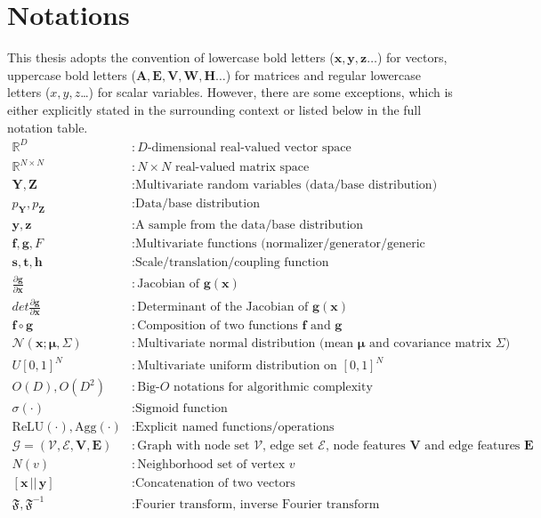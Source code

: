 \section{Notations}
This thesis adopts the convention of lowercase bold letters
($\mathbf{x,y,z}\ldots$) for vectors, uppercase bold letters
($\mathbf{A,E,V,W, H}\ldots$) for matrices and regular lowercase letters
($x,y,z$\ldots)
for scalar variables. However, there are some exceptions, which is either
explicitly stated in the surrounding context or listed below in the full notation table.
\begin{align*}
  \mathbb{R}^D &: \text{$D$-dimensional real-valued vector space} \\
  \mathbb{R}^{N \times N} &: \text{$N \times N$ real-valued matrix space} \\
  \mathbf{Y, Z} &: \text{Multivariate random variables (data/base
  distribution)} \\ p_{\mathbf{Y}}, p_{\mathbf{Z}} &: \text{Data/base
  distribution} \\ \mathbf{y, z} &: \text{A sample from the data/base
  distribution} \\ \mathbf{f, g}, F &: \text{Multivariate functions
  (normalizer/generator/generic function)} \\
  \mathbf{s}, \mathbf{t}, \mathbf{h} &: \text{Scale/translation/coupling function}\\
  \frac{\partial \mathbf{g}}{\partial \mathbf{x}} &:
  \text{Jacobian of $\mathbf{g}(\mathbf{x})$} \\ det \frac{\partial
  \mathbf{g}}{\partial \mathbf{x}} &: \text{Determinant of the Jacobian of
  $\mathbf{g}(\mathbf{x})$} \\ \mathbf{f} \circ \mathbf{g} &: \text{Composition
  of two functions $\mathbf{f}$ and $\mathbf{g}$} \\ \mathcal{N}(\mathbf{x};
  \mathbf{\mu}, \Sigma) &: \text{Multivariate normal distribution (mean
  $\mathbf{\mu}$ and covariance matrix $\Sigma$)} \\ U[0, 1]^{N} &:
  \text{Multivariate uniform distribution on $[0,1]^{N}$} \\ O(D), O(D^2) &:
  \text{Big-$O$ notations for algorithmic complexity} \\ \sigma (\cdot) &:
  \text{Sigmoid function} \\
  \text{ReLU}(\cdot), \text{Agg}(\cdot) &: \text{Explicit named functions/operations} \\
  \mathcal{G} = (\mathcal{V, E}, \mathbf{V, E}) &:
  \text{Graph with node set $\mathcal{V}$, edge set $\mathcal{E}$, node features
  $\mathbf{V}$ and edge features $\mathbf{E}$} \\
  N(v) &: \text{Neighborhood set of vertex $v$} \\
  [\mathbf{x}\,||\, \mathbf{y}] &: \text{Concatenation of two vectors} \\
  \mathfrak{F}, \mathfrak{F}^{-1} &: \text{Fourier transform, inverse Fourier transform}\\
\end{align*}
